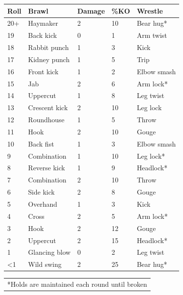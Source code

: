 \begin{multicols}{2}
\begin{minipage}{\columnwidth}
\label{brawlwrestle}
\noindent
\begin{tabular}{|p{}|p{}|p{}|p{}|p{}|}
\hline
Roll	& Brawl	& Damage	& \%KO	& Wrestle \\
\hline\hline
\rowcolor[gray]{.9}20+	& Haymaker		& 2	& 10	& Bear hug* \\
19	& Back kick		& 0	& 1		& Arm twist \\
\rowcolor[gray]{.9}18	& Rabbit punch	& 1	& 3		& Kick \\
17	& Kidney punch	& 1	& 5		& Trip \\
\rowcolor[gray]{.9}16	& Front kick	& 1	& 2		& Elbow smash \\
15	& Jab			& 2	& 6		& Arm lock* \\
\rowcolor[gray]{.9}14	& Uppercut		& 1	& 8		& Leg twist \\
13	& Crescent kick	& 2	& 10	& Leg lock \\
\rowcolor[gray]{.9}12	& Roundhouse	& 1	& 5		& Throw \\
11	& Hook			& 2	& 10	& Gouge \\
\rowcolor[gray]{.9}10	& Back fist		& 1	& 3		& Elbow smash \\
9	& Combination	& 1	& 10	& Leg lock* \\
\rowcolor[gray]{.9}8	& Reverse kick	& 1	& 9		& Headlock* \\
7	& Combination	& 2	& 10	& Throw \\
\rowcolor[gray]{.9}6	& Side kick		& 2	& 8		& Gouge \\
5	& Overhand		& 1	& 3		& Kick \\
\rowcolor[gray]{.9}4	& Cross			& 2	& 5		& Arm lock* \\
3	& Hook			& 2	& 12	& Gouge \\
\rowcolor[gray]{.9}2	& Uppercut		& 2	& 15	& Headlock* \\
1	& Glancing blow	& 0	& 2		& Leg twist \\
\rowcolor[gray]{.9}\textless 1	& Wild swing	& 2	& 25	& Bear hug* \\
\hline
\end{tabular}
\noindent\begin{tabular}{p{}}
*Holds are maintained each round until broken \\
\end{tabular}\vspace{.5em}

\end{minipage}


\end{multicols}
